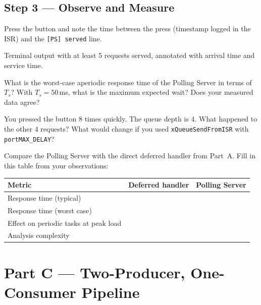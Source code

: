 \documentclass[11pt, a4paper]{article}
\begin{document}
\subsection{Step 3 --- Observe and Measure}

Press the button and note the time between the press (timestamp logged in the ISR) and
the \texttt{[PS] served} line.

\begin{checkpointbox}[~B]
  Terminal output with at least 5 requests served, annotated with arrival time and
  service time.
\end{checkpointbox}

\begin{questionbox}[~B1]
  What is the worst-case aperiodic response time of the Polling Server in terms of $T_s$?
  With $T_s = 50$\,ms, what is the maximum expected wait? Does your measured data agree?
\end{questionbox}

\begin{questionbox}[~B2]
  You pressed the button 8 times quickly. The queue depth is 4. What happened to the
  other 4 requests? What would change if you used \texttt{xQueueSendFromISR} with
  \texttt{portMAX\_DELAY}?
\end{questionbox}

\begin{questionbox}[~B3]
  Compare the Polling Server with the direct deferred handler from Part~A.
  Fill in this table from your observations:

  \smallskip
  \renewcommand{\arraystretch}{1.3}
  \begin{tabular}{@{} p{4.5cm} p{3.5cm} p{3.5cm} @{}}
    \toprule
    \textbf{Metric} & \textbf{Deferred handler} & \textbf{Polling Server} \\
    \midrule
    Response time (typical) & & \\
    Response time (worst case) & & \\
    Effect on periodic tasks at peak load & & \\
    Analysis complexity & & \\
    \bottomrule
  \end{tabular}
  \renewcommand{\arraystretch}{1}
\end{questionbox}

\section{Part C --- Two-Producer, One-Consumer Pipeline}
\end{document}
